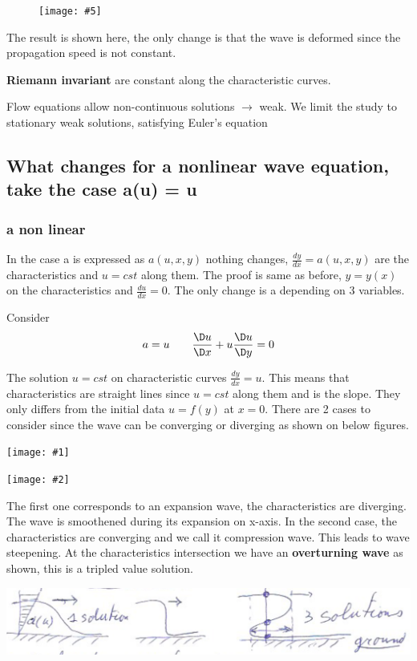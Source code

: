 \documentclass[british,french,11pt, a4paper, openany]{article}
\newcommand{\wrapfig}[6]{%
	\begin{figure}%
		\vspace{-5mm}%
		\texttt{[image: \#5]}%
		\captionof{figure}{}%
		\label{#6}%
	\end{figure}%
}
\newcommand{\minifig}[6]{
	\begin{center}%
		\begin{minipage}{#5\textwidth}%
			\texttt{[image: \#1]}%
			\captionof{figure}{}%
			\label{#1}%
		\end{minipage}%
		\begin{minipage}{#6\textwidth}%
			\texttt{[image: \#2]}%
			\captionof{figure}{}%
			\label{#2}%
		\end{minipage}%
	\end{center}
}
\begin{document}
\wrapfig{7}{l}{5}{0.2}{ch8/10}{ch8/10}
The result is shown here, the only change is that the wave is deformed since the propagation speed is not constant. 

\textbf{Riemann invariant} are constant along the characteristic curves.

Flow equations allow non-continuous solutions $\rightarrow$ weak. We limit the study to stationary weak solutions, satisfying Euler's equation

\subsection{What changes for a nonlinear wave equation, take the case a(u) = u}

\subsubsection{a non linear}
In the case a is expressed as $a(u,x,y)$ nothing changes, $\frac{dy}{dx} = a(u,x,y)$ are the characteristics and $u = cst$ along them. The proof is same as before, $y = y(x)$ on the characteristics and $\frac{du}{dx} = 0$. The only change is a depending on 3 variables.  


	
	Consider
	\begin{equation}
	a = u \qquad \frac{\D u}{\D x} + u \frac{\D u }{\D y} = 0 
	\end{equation}
	
	The solution $u=cst$ on characteristic curves $\frac{dy}{dx} = u$. This means that characteristics are straight lines since $u=cst$ along them and is the slope. They only differs from the initial data $u = f(y)$ at $x = 0$. There are 2 cases to consider since the wave can be converging or diverging as shown on below figures. 
	
	\minifig{ch8/11}{ch8/12}{0.3}{0.3}{0.3}{0.3}
	
	The first one corresponds to an expansion wave, the characteristics are diverging. The wave is smoothened during its expansion on x-axis. In the second case, the characteristics are converging and we call it compression wave. This leads to wave steepening. At the characteristics intersection we have an \textbf{overturning wave} as shown, this is a tripled value solution. 
	
	\begin{center}
		\includegraphics[scale=0.3]{ch8/13}
	\end{center}		
	
\end{document}
